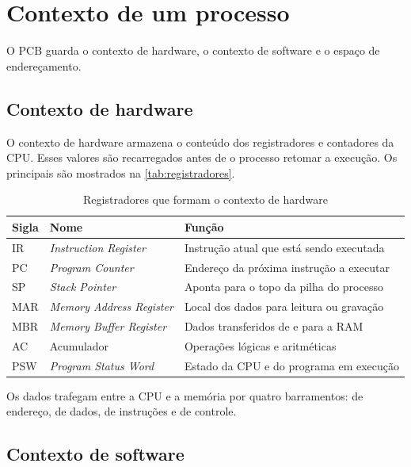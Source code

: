 \section{Contexto de um processo}

O PCB guarda o contexto de hardware, o contexto de software e o espaço de endereçamento.

\subsection{Contexto de hardware}

O contexto de hardware armazena o conteúdo dos registradores e contadores da CPU. Esses valores são recarregados antes de o processo retomar a execução. Os principais são mostrados na \autoref{tab:registradores}.

\begin{table}[H]
  \centering
  \caption{Registradores que formam o contexto de hardware}\label{tab:registradores}
  \begin{tabularx}{\linewidth}{llX}
    \toprule
    \textbf{Sigla} & \textbf{Nome} & \textbf{Função} \\
    \midrule
    IR  & \textit{Instruction Register} & Instrução atual que está sendo executada \\
    PC  & \textit{Program Counter} & Endereço da próxima instrução a executar \\
    SP  & \textit{Stack Pointer} & Aponta para o topo da pilha do processo \\
    MAR & \textit{Memory Address Register} & Local dos dados para leitura ou gravação \\
    MBR & \textit{Memory Buffer Register} & Dados transferidos de e para a RAM \\
    AC  & Acumulador & Operações lógicas e aritméticas \\
    PSW & \textit{Program Status Word} & Estado da CPU e do programa em execução \\
    \bottomrule
  \end{tabularx}
\end{table}

Os dados trafegam entre a CPU e a memória por quatro barramentos: de endereço, de dados, de instruções e de controle.

\subsection{Contexto de software}


